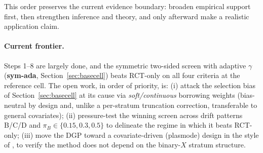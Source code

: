 \documentclass[11pt]{article}
\begin{document}
This order preserves the current evidence boundary: broaden empirical support first, then strengthen inference and theory, and only afterward make a realistic application claim.

\paragraph{Current frontier.}
Steps 1--8 are largely done, and the symmetric two-sided screen with adaptive $\gamma$ (\textbf{sym-ada}, Section~\ref{sec:basecell}) beats RCT-only on all four criteria at the reference cell. The open work, in order of priority, is: (i) attack the selection bias of Section~\ref{sec:basecell} at its cause via \emph{soft/continuous} borrowing weights (bias-neutral by design and, unlike a per-stratum truncation correction, transferable to general covariates); (ii) pressure-test the winning screen across drift patterns B/C/D and $\pi_B\in\{0.15,0.3,0.5\}$ to delineate the regime in which it beats RCT-only; (iii) move the DGP toward a covariate-driven (plasmode) design in the style of \citet{zhou2025causal}, to verify the method does not depend on the binary-$X$ stratum structure.
\end{document}
